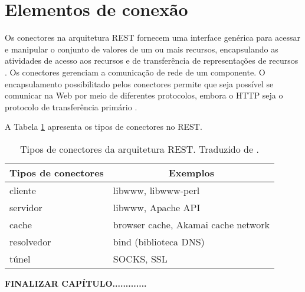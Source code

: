  \section{Elementos de conexão}
  
    Os conectores na arquitetura REST fornecem uma interface genérica para acessar e manipular o conjunto de valores de um ou mais recursos,
    encapsulando as atividades de acesso aos recursos e de transferência de representações de recursos \cite{fielding2002}.
    Os conectores gerenciam a comunicação de rede de um componente. 
    O encapsulamento possibilitado pelos conectores permite que seja possível se comunicar na Web por meio de diferentes protocolos,
    embora o HTTP seja o protocolo de transferência primário \cite{fielding2002}.
    
    A Tabela \ref{rest-connectors-elements} apresenta os tipos de conectores no REST.
    
    \begin{table}[ht!]
    \centering
    \caption{Tipos de conectores da arquitetura REST. Traduzido de \cite{fielding2002}.}
    \label{rest-connectors-elements}
    \begin{tabular}{l|l}
    \hline
    \multicolumn{1}{c|}{\textbf{Tipos de conectores}} & \multicolumn{1}{c}{\textbf{Exemplos}} \\ \hline
    cliente                                            & libwww, libwww-perl                    \\ \hline
    servidor                                           & libwww, Apache API                     \\ \hline
    cache                                              & browser cache, Akamai cache network    \\ \hline
    resolvedor                                         & bind (biblioteca DNS)                  \\ \hline
    túnel                                              & SOCKS, SSL                             \\ \hline
    \end{tabular}
    \end{table}
    
    
    
\textbf{FINALIZAR CAPÍTULO.............}